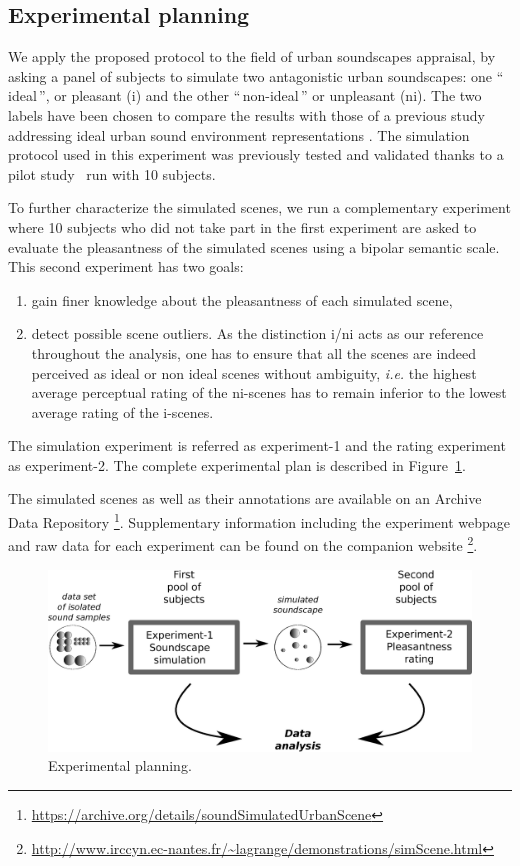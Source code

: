 \documentclass[twoside,twocolumn]{article}
\begin{document}
\subsection{Experimental planning}

We apply the proposed protocol to the field of urban soundscapes appraisal, by asking a panel of subjects to simulate two antagonistic urban soundscapes:  one ``\,ideal\,'', or pleasant (i) and the other ``\,non-ideal\,'' or unpleasant (ni). The two labels have been chosen to compare the results with those of a previous study addressing ideal urban sound environment representations \cite{guastavino_ideal_2006}. The simulation protocol used in this experiment was previously tested and validated thanks to a pilot study~\cite{soundscape3} run with 10 subjects.

To further characterize the simulated scenes, we run a complementary experiment where 10 subjects who did not take part in the first experiment are asked to evaluate the pleasantness of the simulated scenes using a bipolar semantic scale. This second experiment has two goals:

\begin{enumerate}
\item gain finer knowledge about the pleasantness of each simulated scene,
\item detect possible scene outliers. As the distinction i/ni acts as our reference throughout the analysis, one has to ensure that all the scenes are indeed perceived as ideal or non ideal scenes without ambiguity, \textit{i.e.} the highest average perceptual rating of the ni-scenes has to remain inferior to the lowest average rating of the i-scenes.
\end{enumerate}

The simulation experiment is referred as experiment-1 and the rating experiment as experiment-2. The complete experimental plan is described in Figure~\ref{fig:expLan}.

The simulated scenes as well as their annotations are available on an Archive Data Repository \footnote{\url{https://archive.org/details/soundSimulatedUrbanScene}}. Supplementary information including the experiment webpage and raw data for each experiment can be found on the companion website \footnote{\url{http://www.irccyn.ec-nantes.fr/~lagrange/demonstrations/simScene.html}}.

\begin{figure}[t]
\begin{center}
\includegraphics[width=.4\paperwidth]{../gfx/5.eps}
\caption{\label{fig:expLan} Experimental planning.}
\end{center}
\end{figure}
\end{document}
